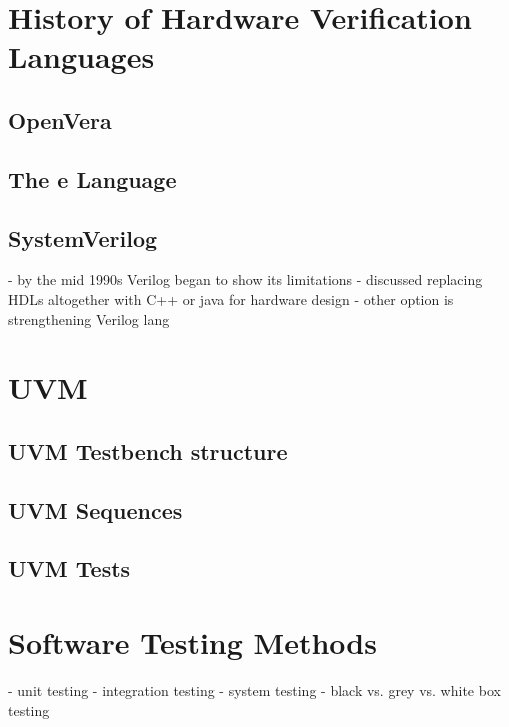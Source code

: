 \documentclass[11pt]{book}
\begin{document}
\section{History of Hardware Verification Languages} %

\subsection{OpenVera}

\cite[Sec. 7, pp. 51-??]{flake2020a}

\subsection{The e Language}

\subsection{SystemVerilog}

\cite[Sec. 6, pp. 43]{flake2020a}
- by the mid 1990s Verilog began to show its limitations 
- discussed replacing HDLs altogether with C++ or java for hardware design
- other option is strengthening Verilog lang

\section{UVM} %

\subsection{UVM Testbench structure}

\subsection{UVM Sequences}

\subsection{UVM Tests}

\section{Software Testing Methods} %
- unit testing
- integration testing
- system testing
- black vs. grey vs. white box testing
\end{document}
